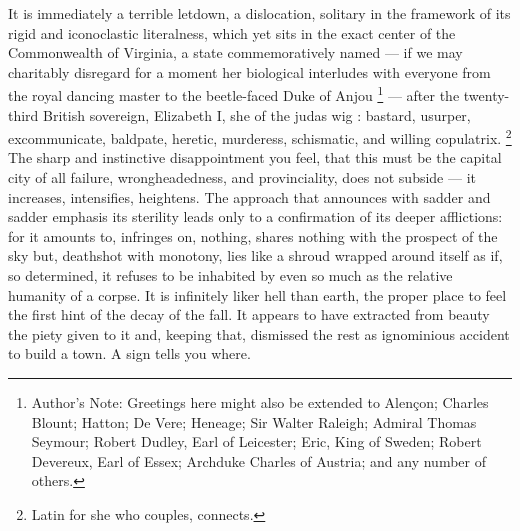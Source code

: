   It is immediately a terrible letdown, a dislocation, solitary in the framework 
of its rigid and iconoclastic 
literalness, which yet sits in the exact center of the Commonwealth of Virginia, a 
state commemoratively 
named --- if we may charitably disregard for a moment her biological interludes 
with everyone from the 
royal dancing master to the beetle-faced Duke of Anjou
\footnote{Author's Note: Greetings here might also be extended to Alençon; Charles Blount; Hatton; 
De Vere; Heneage; Sir Walter Raleigh; Admiral Thomas Seymour; Robert Dudley, 
Earl of Leicester; Eric, King of Sweden; Robert Devereux, Earl of Essex; 
Archduke Charles of Austria; and any number of others.}  
--- after the twenty-third British sovereign, Elizabeth I, she of the judas wig
: bastard, usurper, 
excommunicate, baldpate, heretic, murderess, schismatic, 
and willing copulatrix. 
\footnote{Latin for she who couples, connects.}
The sharp and instinctive disappointment you feel, that this must be the capital 
city of all failure, wrongheadedness, and provinciality, does not subside --- it 
increases, intensifies, heightens. The approach that announces with sadder and 
sadder emphasis its sterility leads only to a confirmation of its deeper afflictions: 
for it amounts to, infringes 
on, nothing, shares nothing with the prospect of the sky but, deathshot 
with monotony, lies like a shroud wrapped around itself as if, so 
determined, it refuses to be inhabited by even so much as the relative 
humanity of a corpse. It is infinitely liker hell than earth, the proper 
place to feel the first hint of the decay of the fall. It appears to have 
extracted from beauty the piety given to it 
and, keeping that, dismissed the rest as ignominious 
accident to build a town. A sign tells you where.
 
